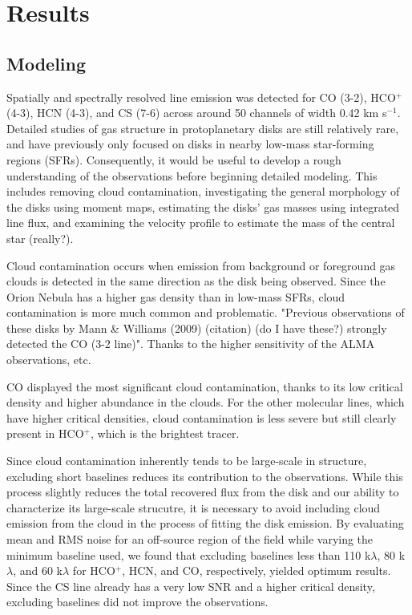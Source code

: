 \chapter{Results}
\label{chap:results}

\section{Modeling}


Spatially and spectrally resolved line emission was detected for CO (3-2), HCO$^{+}$ (4-3), HCN (4-3), and CS (7-6) across around 50 channels of width 0.42 km s$^{-1}$. Detailed studies of gas structure in protoplanetary disks are still relatively rare, and have previously only focused on disks in nearby low-mass star-forming regions (SFRs). Consequently, it would be useful to develop a rough understanding of the observations before beginning detailed modeling. This includes removing cloud contamination, investigating the general morphology of the disks using moment maps, estimating the disks' gas masses using integrated line flux, and examining the velocity profile to estimate the mass of the central star (really?).

Cloud contamination occurs when emission from background or foreground gas clouds is detected in the same direction as the disk being observed. Since the Orion Nebula has a higher gas density than in low-mass SFRs, cloud contamination is more much common and problematic. "Previous observations of these disks by Mann & Williams (2009) (citation) (do I have these?) strongly detected the CO (3-2 line)". Thanks to the higher sensitivity of the ALMA observations, etc.

CO displayed the most significant cloud contamination, thanks to its low critical density and higher abundance in the clouds. For the other molecular lines, which have higher critical densities, cloud contamination is less severe but still clearly present in HCO$^{+}$, which is the brightest tracer.

Since cloud contamination inherently tends to be large-scale in structure, excluding short baselines reduces its contribution to the observations. While this process slightly reduces the total recovered flux from the disk and our ability to characterize its large-scale strucutre, it is necessary to avoid including cloud emission from the cloud in the process of fitting the disk emission. By evaluating mean and RMS noise for an off-source region of the field while varying the minimum baseline used, we found that excluding baselines less than 110 k$\lambda$, 80 k$\lambda$, and 60  k$\lambda$ for HCO$^{+}$, HCN, and CO, respectively, yielded optimum results. Since the CS line already has a very low SNR and a higher critical density, excluding baselines did not improve the observations.





